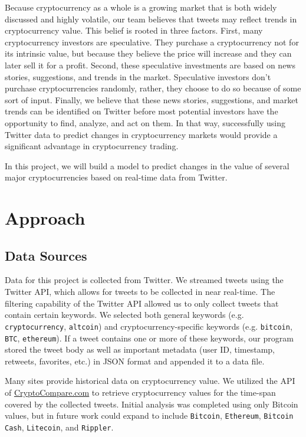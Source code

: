 \documentclass[sigconf]{acmart}
\newcommand{\code}{\texttt}
\begin{document}
Because cryptocurrency as a whole is a growing market that is both widely discussed and highly volatile, our team believes that tweets may reflect trends in cryptocurrency value. This belief is rooted in three factors. First, many cryptocurrency investors are speculative. They purchase a cryptocurrency not for its intrinsic value, but because they believe the price will increase and they can later sell it for a profit. Second, these speculative investments are based on news stories, suggestions, and trends in the market. Speculative investors don't purchase cryptocurrencies randomly, rather, they choose to do so because of some sort of input. Finally, we believe that these news stories, suggestions, and market trends can be identified on Twitter before most potential investors have the opportunity to find, analyze, and act on them. In that way, successfully using Twitter data to predict changes in cryptocurrency markets would provide a significant advantage in cryptocurrency trading. 

In this project, we will build a model to predict changes in the value of several major cryptocurrencies based on real-time data from Twitter.


\section{Approach}

\subsection{Data Sources}
Data for this project is collected from Twitter. We streamed tweets using the Twitter API, which allows for tweets to be collected in near real-time. The filtering capability of the Twitter API allowed us to only collect tweets that contain certain keywords. We selected both general keywords (e.g. \code{cryptocurrency}, \code{altcoin}) and cryptocurrency-specific keywords (e.g. \code{bitcoin}, \code{BTC}, \code{ethereum}). If a tweet contains one or more of these keywords, our program stored the tweet body as well as important metadata (user ID, timestamp, retweets, favorites, etc.) in JSON format and appended it to a data file.

Many sites provide historical data on cryptocurrency value. We utilized the API of \href{https://www.cryptocompare.com}{CryptoCompare.com} to retrieve cryptocurrency values for the time-span covered by the collected tweets. Initial analysis was completed using only Bitcoin values, but in future work could expand to include \code{Bitcoin}, \code{Ethereum}, \code{Bitcoin Cash}, \code{Litecoin}, and \code{Rippler}.
\end{document}
